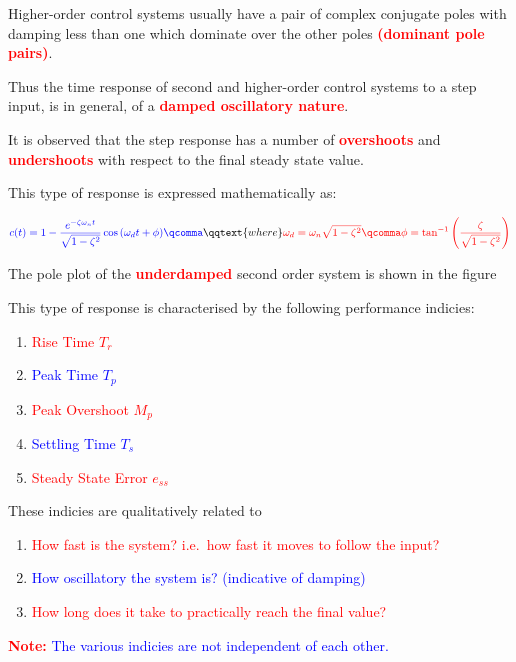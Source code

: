 \documentclass[
  14pt,
  a4paper,
  oneside,
  open=any,
  a4paper,
  14pt]{report}
\begin{document}
Higher-order control systems usually have a pair of complex conjugate
poles with damping less than one which dominate over the other poles
\textcolor{red}{\textbf{(dominant pole pairs)}}.

Thus the time response of second and higher-order control systems to a
step input, is in general, of a \textcolor{red}{\textbf{damped
oscillatory nature}}.

It is observed that the step response has a number of
\textcolor{red}{\textbf{overshoots}} and
\textcolor{red}{\textbf{undershoots}} with respect to the final steady
state value.

This type of response is expressed mathematically as:

\[
    \textcolor{blue}{c(t) = 1 - \dfrac{e^{-\zeta \omega_n t}}{\sqrt{1-\zeta^2}} \cos{(\omega_d t + \phi)}\qcomma} \qqtext{where} \textcolor{red}{\omega_d = \omega_n \sqrt{1-\zeta^2} \qcomma \phi = \tan^{-1}\left(\dfrac{\zeta}{\sqrt{1-\zeta^2}}\right)}
\]

The pole plot of the \textcolor{red}{\textbf{underdamped}} second order
system is shown in the figure

This type of response is characterised by the following performance
indicies:

\begin{enumerate}
\def\labelenumi{\arabic{enumi}.}
\item
  \textcolor{red}{Rise Time \(T_r\)}
\item
  \textcolor{blue}{Peak Time \(T_p\)}
\item
  \textcolor{red}{Peak Overshoot \(M_p\)}
\item
  \textcolor{blue}{Settling Time \(T_s\)}
\item
  \textcolor{red}{Steady State Error \(e_{ss}\)}
\end{enumerate}

These indicies are qualitatively related to

\begin{enumerate}
\def\labelenumi{\alph{enumi}.}
\item
  \textcolor{red}{How fast is the system? i.e.~how fast it moves to
  follow the input?}
\item
  \textcolor{blue}{How oscillatory the system is? (indicative of
  damping)}
\item
  \textcolor{red}{How long does it take to practically reach the final
  value?}
\end{enumerate}

\textcolor{red}{\textbf{Note:}} \textcolor{blue}{The various indicies
are not independent of each other.}
\end{document}

